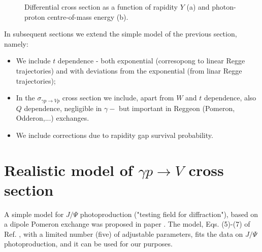 \documentclass[12pt]{article}
\begin{document}
\begin{figure}[!h]
  \centering
  \caption{Differential cross section as a function of rapidity $Y$ (a) and photon-proton centre-of-mass energy (b).}
\end{figure}

In subsequent sections we extend the simple model of the previous section, namely:
\begin{itemize}
\item We include $t$ dependence - both exponential (corresopong to linear Regge trajectories) and with deviations from the exponential (from linar Regge trajectories); 
\item In the $\sigma_{\gamma p \rightarrow V p}$ cross section we include, apart from $W$ and $t$ dependence, also $Q$ dependence, negligible in $\gamma-$ but important in Reggeon (Pomeron, Odderon,...) exchanges. 
\item We include corrections due to rapidity gap survival probability.
\end{itemize} 

\section{Realistic model of $\gamma p\rightarrow V$ cross section}\label{realistic}
A simple model for $J/\Psi$ photoproduction ("testing field for diffraction"), based on a dipole Pomeron exchange 
was proposed in paper \cite{Francesco}. The model, Eqs. (5)-(7) of 
Ref. \cite{Francesco}, with a limited number (five) of adjustable parameters, fits the data on $J/\Psi$ photoproduction, and it can be used for our purposes.
\end{document}
